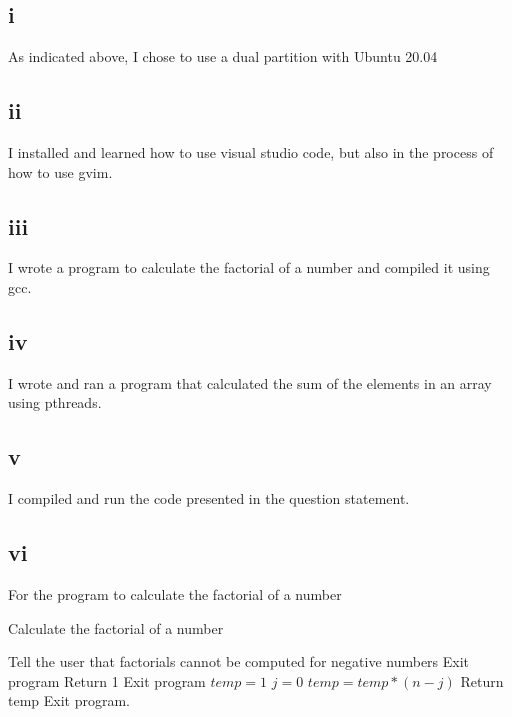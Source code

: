 \documentclass{article}
\begin{document}
\subsection{i}
As indicated above, I chose to use a dual partition with Ubuntu 20.04
\subsection{ii}
I installed and learned how to use visual studio code, but also in the process of how to use gvim. 
\subsection{iii}
I wrote a program to calculate the factorial of a number and compiled it using gcc. 
\subsection{iv}
I wrote and ran a program that calculated the sum of the elements in an array using pthreads. 
\subsection{v}
I compiled and run the code presented in the question statement.
\subsection{vi}
For the program to calculate the factorial of a number 

	\begin{algorithm}
		\caption{Calculate the factorial of a number}
		
		\begin{algorithmic}[1]
			
			      
			\State Tell the user that factorials cannot be computed for negative numbers
			\State Exit program
			\EndIf
			\State Return 1
			\State Exit program
			\EndIf
			\State $temp = 1$
			\State $j = 0$
			\State $temp = temp * (n - j)$
			\State Return temp
			\State Exit program.
			\EndWhile
			\EndProcedure
		\end{algorithmic}
	\end{algorithm}
\end{document}
